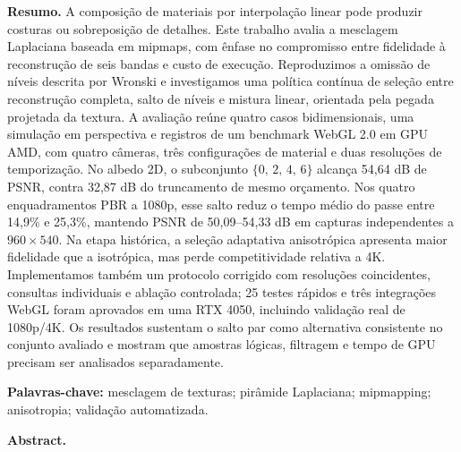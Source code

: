 \begin{minipage}{0.94\textwidth}
\fontsize{8.5}{9.5}\selectfont
\noindent\textbf{Resumo.}
A composição de materiais por interpolação linear pode produzir costuras ou sobreposição de detalhes. Este trabalho avalia a mesclagem Laplaciana baseada em mipmaps, com ênfase no compromisso entre fidelidade à reconstrução de seis bandas e custo de execução. Reproduzimos a omissão de níveis descrita por Wronski e investigamos uma política contínua de seleção entre reconstrução completa, salto de níveis e mistura linear, orientada pela pegada projetada da textura. A avaliação reúne quatro casos bidimensionais, uma simulação em perspectiva e registros de um benchmark WebGL 2.0 em GPU AMD, com quatro câmeras, três configurações de material e duas resoluções de temporização. No albedo 2D, o subconjunto $\{0,\,2,\,4,\,6\}$ alcança 54,64 dB de PSNR, contra 32,87 dB do truncamento de mesmo orçamento. Nos quatro enquadramentos PBR a 1080p, esse salto reduz o tempo médio do passe entre 14,9\% e 25,3\%, mantendo PSNR de 50,09--54,33 dB em capturas independentes a $960\times540$. Na etapa histórica, a seleção adaptativa anisotrópica apresenta maior fidelidade que a isotrópica, mas perde competitividade relativa a 4K. Implementamos também um protocolo corrigido com resoluções coincidentes, consultas individuais e ablação controlada; 25 testes rápidos e três integrações WebGL foram aprovados em uma RTX 4050, incluindo validação real de 1080p/4K. Os resultados sustentam o salto par como alternativa consistente no conjunto avaliado e mostram que amostras lógicas, filtragem e tempo de GPU precisam ser analisados separadamente.
\par\vspace{3pt}
\noindent\textbf{Palavras-chave:} mesclagem de texturas; pirâmide Laplaciana; mipmapping; anisotropia; validação automatizada.
\par\vspace{5pt}
\noindent\textbf{Abstract.}

\end{minipage}
